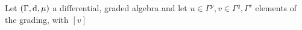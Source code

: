 \begin{Def}[Massey Product for $ n=3 $]
	Let $ (\Gamma,\operatorname{d},\mu) $ a differential, graded
	algebra and let $ u\in\Gamma^p,v\in\Gamma^q,\Gamma^r $ elements
	of the grading, with $ [v] $ 
\end{Def}


